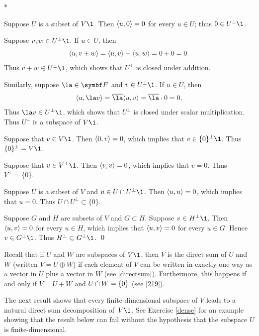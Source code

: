 \proof
\begin{subtheorem}*
\item
Suppose $U$ is a subset of $V\1$. Then $\langle u,0\rangle = 0$ for every $u \in U$; thus $0 \in U^\perp\1$.

Suppose $v, w \in U^\perp\1$. If $u \in U$, then
\[
\langle u,v+w\rangle = \langle u,v\rangle + \langle u,w\rangle = 0 + 0 = 0.
\]
Thus $v + w \in U^\perp\1$, which shows that $U^\perp$ is closed under addition.

Similarly, suppose $\la \in \F{}$ and $v \in U^\perp\1$. If $u \in U$, then
\[
\ip{u, \la v} = \overline{\la} \ip{u,v} = \overline{\la} \cdot 0 = 0.
\]
Thus $\la v \in U^\perp\1$, which shows that $U^\perp$ is closed under scalar multiplication. Thus $U^\perp$ is a subspace of $V\1$.

\item
Suppose that $v \in V\1$. Then $\langle0,v\rangle = 0$, which implies that $v \in \{0\}^\perp\1$. Thus $\{0\}^\perp = V\1$.

\item
Suppose that $v \in V^\perp\1$. Then $\langle v,v\rangle = 0$, which implies that $v = 0$. Thus $V^\perp = \{0\}$.

\item
Suppose $U$ is a subset of $V$ and $u \in U \cap U^\perp\1$. Then $\langle u,u\rangle = 0$, which implies that $u = 0$. Thus $U \cap U^\perp \subset \{0\}$.

\item
Suppose $G$ and $H$ are subsets of $V$ and $G \subset H$. Suppose $v \in H^\perp\1$. Then $\langle u,v\rangle = 0$ for every $u \in H$, which implies that $\langle u,v\rangle = 0$ for every $u \in G$. Hence $v \in G^\perp\1$. Thus $H^\perp \subset G^\perp\1$.
\qed
\end{subtheorem}

Recall that if $U$ and $W$ are subspaces of $V\1$, then $V$ is the direct sum of $U$ and $W$ (written $V = U \oplus W$) if each element of $V$ can be written in exactly one way as a vector in $U$ plus a vector in $W$ (see \ref{directsum}). Furthermore, this happens if and only if $V = U + W$ and $U \cap W = \{0\}$ (see  \ref{219}).

The next result shows that every finite-dimensional subspace of $V$ leads to a natural direct sum decomposition of~$V\1$. See Exercise \ref{dense} for an example showing that the result below can fail without the hypothesis that the subspace $U$ is finite-dimensional.


